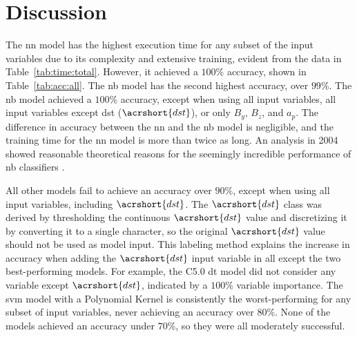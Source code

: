 \documentclass[sn-mathphys-num]{sn-jnl}%
\begin{document}
\section{Discussion}
\label{sec:Discussion}

The \acrfull{nn} model has the highest execution time for any subset of the input variables due to its complexity and extensive training, evident from the data in Table~\ref{tab:time:total}. However, it achieved a $100\%$ accuracy, shown in Table~\ref{tab:acc:all}. The \acrfull{nb} model has the second highest accuracy, over $99\%$. The \acrshort{nb} model achieved a $100\%$ accuracy, except when using all input variables, all input variables except \acrlong{dst} ($\acrshort{dst}$), or only $B_{y}$, $B_{z}$, and $a_{p}$. The difference in accuracy between the \acrshort{nn} and the \acrshort{nb} model is negligible, and the training time for the \acrshort{nn} model is more than twice as long. An analysis in 2004 showed reasonable theoretical reasons for the seemingly incredible performance of \acrshort{nb} classifiers \cite{Zhang2004}.

All other models fail to achieve an accuracy over $90\%$, except when using all input variables, including $\acrshort{dst}$. The $\acrshort{dst}$ class was derived by thresholding the continuous $\acrshort{dst}$ value and discretizing it by converting it to a single character, so the original $\acrshort{dst}$ value should not be used as model input. This labeling method explains the increase in accuracy when adding the $\acrshort{dst}$ input variable in all except the two best-performing models. For example, the C5.0 \acrshort{dt} model did not consider any variable except $\acrshort{dst}$, indicated by a $100\%$ variable importance. The \acrfull{svm} model with a Polynomial Kernel is consistently the worst-performing for any subset of input variables, never achieving an accuracy over $80\%$. None of the models achieved an accuracy under $70\%$, so they were all moderately successful.
\end{document}
